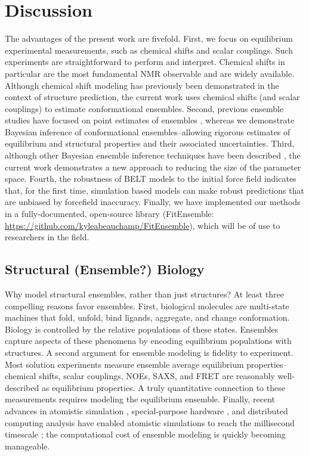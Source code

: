 \documentclass[11pt,titlepage]{article}
\begin{document}
\section*{Discussion}

The advantages of the present work are fivefold.  First, we focus on equilibrium experimental measurements, such as chemical shifts and scalar couplings.  Such experiments are straightforward to perform and interpret.  Chemical shifts in particular are the most fundamental NMR observable and are widely available.  Although chemical shift modeling has previously been demonstrated \cite{shen2008consistent} in the context of structure prediction, the current work uses chemical shifts (and scalar couplings) to estimate conformational ensembles.  Second, previous ensemble studies have focused on point estimates of ensembles \cite{rozycki2011saxs, lindorff2005simultaneous, lange2008recognition}, whereas we demonstrate Bayesian inference of conformational ensembles--allowing rigorous estimates of equilibrium and structural properties and their associated uncertainties.  Third, although other Bayesian ensemble inference techniques have been described \cite{fisher2010}, the current work demonstrates a 
new approach to reducing the size of the parameter space.  Fourth, the robustness of BELT models to the initial force field indicates that, for the first time, simulation based models can make robust predictions that are unbiased by forcefield inaccuracy.  Finally, we have implemented our methods in a fully-documented, open-source library (FitEnsemble: \url{https://github.com/kyleabeauchamp/FitEnsemble}), which will be of use to researchers in the field.  

\subsection*{Structural (Ensemble?) Biology}

Why model structural ensembles, rather than just structures?  At least three compelling reasons favor ensembles.  First, biological molecules are multi-state machines that fold, unfold, bind ligands, aggregate, and change conformation.  Biology is controlled by the relative populations of these states.  Ensembles capture aspects of these phenomena by encoding equilibrium populations with structures.  A second argument for ensemble modeling is fidelity to experiment.  Most solution experiments measure ensemble average equilibrium properties--chemical shifts, scalar couplings, NOEs, SAXS, and FRET are reasonably well-described as equilibrium properties.  A truly quantitative connection to these measurements requires modeling the equilibrium ensemble.  Finally, recent advances in atomistic simulation  \citep{hess2008, pronk2013gromacs, eastman2012openmm, eastman2010openmm}, special-purpose hardware  \citep{Shaw2008}, and distributed computing analysis  \citep{emma, msmb2} have enabled atomistic simulations to 
reach the millisecond timescale  \citep{voelz2010, bowman2011atomistic, shaw2010, Shaw2011}; the computational cost of ensemble modeling is quickly becoming manageable.
\end{document}
